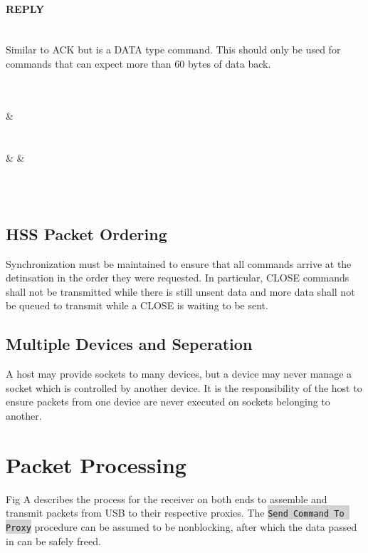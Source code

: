 \documentclass[10pt]{article}
\begin{document}
	\paragraph{REPLY} \mbox{}\\
	Similar to ACK but is a DATA type command. This should only be used for commands that can expect more than 60 bytes of data back. \\
	\\
	\begin{bytefield}[bitwidth=1.7em]{32}
		 \\
		 &
		 \\
		 \\
		 \\
		 &
		 &
		 \\
		 \\
	\end{bytefield}\\

	\subsection{HSS Packet Ordering}
	Synchronization must be maintained to ensure that all commands arrive at the detinsation in the order they were requested. In particular, CLOSE commands shall not be transmitted while there is still unsent data and more data shall not be queued to transmit while a CLOSE is waiting to be sent. 
	
	\subsection{Multiple Devices and Seperation}
	A host may provide sockets to many devices, but a device may never manage a socket which is controlled by another device. It is the responsibility of the host to ensure packets from one device are never executed on sockets belonging to another.
	
	\section{Packet Processing}
	Fig A describes the process for the receiver on both ends to assemble and transmit packets from USB to their respective proxies. The \colorbox{lightgray}{\lstinline{Send Command To Proxy}} procedure can be assumed to be nonblocking, after which the data passed in can be safely freed. \\
	\\	
\end{document}
